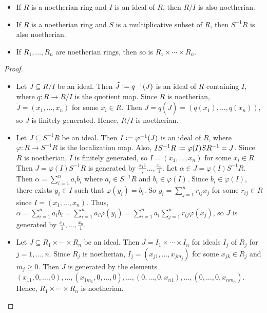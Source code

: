 \begin{lemma}
    \begin{itemize}
        \item If $R$ is a noetherian ring and $I$ is an ideal of $R$, then $R/I$ is also noetherian.
        \item If $R$ is a noetherian ring and $S$ is a multiplicative subset of $R$, then $S^{-1}R$ is also noetherian.
        \item If $R_{1},\ldots,R_{n}$ are noetherian rings, then so is $R_{1} \times \cdots \times R_{n}$.
    \end{itemize}
\end{lemma}
\begin{proof}
    \begin{itemize}
        \item Let $J \subseteq R/I$ be an ideal. Then $\tilde{J} \vcentcolon= q^{-1}(J)$ is an ideal of $R$ containing $I$, where $q : R \to R/I$ is the quotient map. Since $R$ is noetherian, $\tilde{J} = (x_{1},\ldots,x_{n})$ for some $x_{i} \in R$. Then $J = q(\tilde{J}) = (q(x_{1}),\ldots,q(x_{n}))$, so $J$ is finitely generated. Hence, $R/I$ is noetherian.
        \item Let $J \subseteq S^{-1}R$ be an ideal. Then $I \vcentcolon= \varphi^{-1}(J)$ is an ideal of $R$, where $\varphi : R \to S^{-1}R$ is the localization map. Also, $IS^{-1}R \vcentcolon= \varphi(I)SR^{-1} = J$. Since $R$ is noetherian, $I$ is finitely generated, so $I = (x_{1},\ldots,x_{n})$ for some $x_{i} \in R$. Then $J = \varphi(I)S^{-1}R$ is generated by $\frac{x_{1}{1}},\ldots,\frac{x_{n}}{1}$. Let $\alpha \in J = \varphi(I)S^{-1}R$. Then $\alpha = \sum_{i=1}^{n} a_{i}b_{i}$ where $a_{i} \in S^{-1}R$ and $b_{i} \in \varphi(I)$. Since $b_{i} \in \varphi(I)$, there exists $y_{i} \in I$ such that $\varphi(y_{i}) = b_{i}$. So $y_{i} = \sum_{j=1}^{n} r_{ij} x_{j}$ for some $r_{ij} \in R$ since $I = (x_{1},\ldots,x_{n})$. Thus, $\alpha = \sum_{i=1}^{n} a_{i} b_{i} = \sum_{i=1}^{n} a_{i} \varphi(y_{i}) = \sum_{i=1}^{n} a_{i} \sum_{j=1}^{n} r_{ij} \varphi(x_{j})$, so $J$ is generated by $\frac{x_{1}}{1},\ldots,\frac{x_{n}}{1}$.
        \item Let $J \subseteq R_{1} \times \cdots \times R_{n}$ be an ideal. Then $J = I_{1} \times \cdots \times I_{n}$ for ideals $I_{j}$ of $R_{j}$ for $j = 1,\ldots,n$. Since $R_{j}$ is noetherian, $I_{j} = (x_{j1},\ldots,x_{jm_{j}})$ for some $x_{jk} \in R_{j}$ and $m_{j} \geq 0$. Then $J$ is generated by the elements $(x_{11},0,\ldots,0),\ldots,(x_{1m_{1}},0,\ldots,0),\ldots,(0,\ldots,0,x_{n1}),\ldots,(0,\ldots,0,x_{nm_{n}})$. Hence, $R_{1} \times \cdots \times R_{n}$ is noetherian.
    \end{itemize}
\end{proof}

